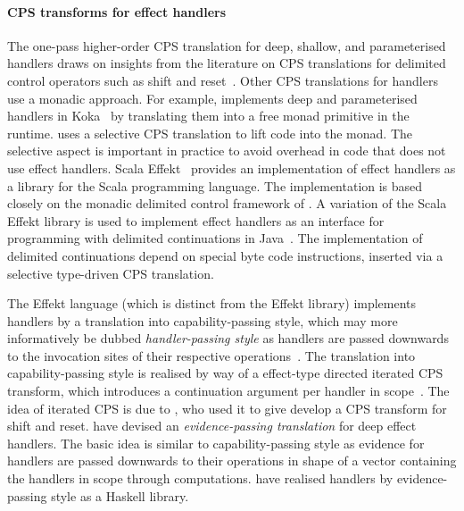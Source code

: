 \documentclass[12pt,phd,lfcs,twoside,openright,logo,leftchapter,normalheadings]{infthesis}
\theoremstyle{plain}
\theoremstyle{definition}
\begin{document}
\paragraph{CPS transforms for effect handlers}
%
The one-pass higher-order CPS translation for deep, shallow, and
parameterised handlers draws on insights from the literature on CPS
translations for delimited control operators such as shift and
reset~\citep{DanvyF90,DanvyF92,DanvyN03,MaterzokB12}.
%
%
Other CPS translations for handlers use a monadic approach. For
example, \citet{Leijen17} implements deep and parameterised handlers
in Koka~\citep{Leijen14} by translating them into a free monad
primitive in the runtime. \citeauthor{Leijen17} uses a selective CPS
translation to lift code into the monad. The selective aspect is
important in practice to avoid overhead in code that does not use
effect handlers.
%
Scala Effekt~\citep{BrachthauserS17,BrachthauserSO20} provides an
implementation of effect handlers as a library for the Scala
programming language. The implementation is based closely on the
monadic delimited control framework of \citet{DybvigJS07}.
%
A variation of the Scala Effekt library is used to implement effect
handlers as an interface for programming with delimited continuations
in Java~\citep{BrachthauserSO18}. The implementation of delimited
continuations depend on special byte code instructions, inserted via a
selective type-driven CPS translation.

The Effekt language (which is distinct from the Effekt library)
implements handlers by a translation into capability-passing style,
which may more informatively be dubbed \emph{handler-passing style} as
handlers are passed downwards to the invocation sites of their
respective operations~\cite{SchusterBO20,BrachthauserSO20b}. The
translation into capability-passing style is realised by way of a
effect-type directed iterated CPS transform, which introduces a
continuation argument per handler in scope~\cite{SchusterBO20}. The
idea of iterated CPS is due to \citet{DanvyF90}, who used it to give
develop a CPS transform for shift and reset.
%
\citet{XieBHSL20} have devised an \emph{evidence-passing translation}
for deep effect handlers. The basic idea is similar to
capability-passing style as evidence for handlers are passed downwards
to their operations in shape of a vector containing the handlers in
scope through computations. \citet{XieL20} have realised handlers by
evidence-passing style as a Haskell library.
\end{document}
